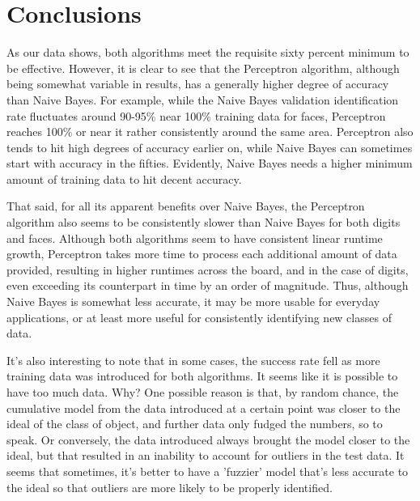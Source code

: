 \documentclass{article}
\begin{document}
\section{Conclusions}
As our data shows, both algorithms meet the requisite sixty percent minimum to be effective. However, it is clear to see that the Perceptron algorithm, although being somewhat variable in results, has a generally higher degree of accuracy than Naive Bayes. For example, while the Naive Bayes validation identification rate fluctuates around 90-95\% near 100\% training data for faces, Perceptron reaches 100\% or near it rather consistently around the same area. Perceptron also tends to hit high degrees of accuracy earlier on, while Naive Bayes can sometimes start with accuracy in the fifties. Evidently, Naive Bayes needs a higher minimum amount of training data to hit decent accuracy.
\par
That said, for all its apparent benefits over Naive Bayes, the Perceptron algorithm also seems to be consistently slower than Naive Bayes for both digits and faces. Although both algorithms seem to have consistent linear runtime growth, Perceptron takes more time to process each additional amount of data provided, resulting in higher runtimes across the board, and in the case of digits, even exceeding its counterpart in time by an order of magnitude. Thus, although Naive Bayes is somewhat less accurate, it may be more usable for everyday applications, or at least more useful for consistently identifying new classes of data.
\par
It's also interesting to note that in some cases, the success rate fell as more training data was introduced for both algorithms. It seems like it is possible to have too much data. Why? One possible reason is that, by random chance, the cumulative model from the data introduced at a certain point was closer to the ideal of the class of object, and further data only fudged the numbers, so to speak. Or conversely, the data introduced always brought the model closer to the ideal, but that resulted in an inability to account for outliers in the test data. It seems that sometimes, it's better to have a 'fuzzier' model that's less accurate to the ideal so that outliers are more likely to be properly identified.
\end{document}
